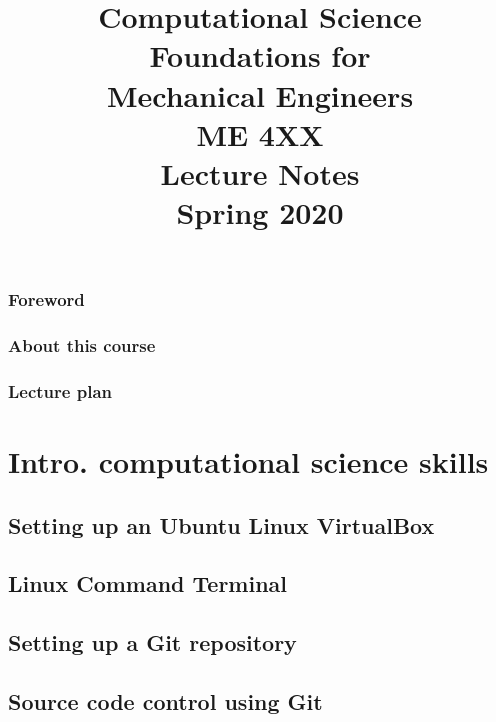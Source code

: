 \documentclass{book}[11pt]
\title{Computational Science Foundations for \\Mechanical Engineers\\ ME 4XX \\ \vspace{16pt}Lecture Notes \\ Spring 2020}
\begin{document}
\setlength{\parindent}{0cm}

\maketitle

\copyrightPage

\mytoc

\section*{Foreword}


\newpage
\section*{About this course}



\newpage
\section*{Lecture plan}


\part{Intro. computational science skills}

\chapter{Setting up an Ubuntu Linux VirtualBox}
\label{linux.chap}
\adjustmtc[0]


\chapter{Linux Command Terminal}
\label{terminal.chap}


\chapter{Setting up a Git repository}
\label{git.chap}


\chapter{Source code control using Git}
\label{gitSource.chap}


% 
\end{document}
